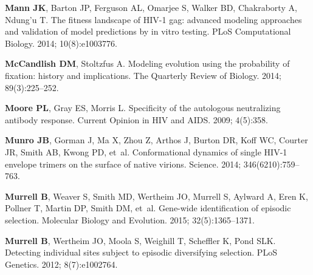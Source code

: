 \documentclass[9pt]{elife}
\begin{document}
\begin{thebibliography}{114}
\textbf{\color{eLifeMediumGrey} Mann JK}, Barton JP, Ferguson AL, Omarjee S,
  Walker BD, Chakraborty A, Ndung'u T.
\newblock The fitness landscape of {HIV-1} gag: advanced modeling approaches
  and validation of model predictions by in vitro testing.
\newblock PLoS Computational Biology.  2014; 10(8):e1003776.

\textbf{\color{eLifeMediumGrey} McCandlish DM}, Stoltzfus A.
\newblock Modeling evolution using the probability of fixation: history and
  implications.
\newblock The Quarterly Review of Biology.  2014; 89(3):225--252.

\textbf{\color{eLifeMediumGrey} Moore PL}, Gray ES, Morris L.
\newblock Specificity of the autologous neutralizing antibody response.
\newblock Current Opinion in HIV and AIDS.  2009; 4(5):358.

\textbf{\color{eLifeMediumGrey} Munro JB}, Gorman J, Ma X, Zhou Z, Arthos J,
  Burton DR, Koff WC, Courter JR, Smith AB, Kwong PD, et~al.
\newblock Conformational dynamics of single HIV-1 envelope trimers on the
  surface of native virions.
\newblock Science.  2014; 346(6210):759--763.

\textbf{\color{eLifeMediumGrey} Murrell B}, Weaver S, Smith MD, Wertheim JO,
  Murrell S, Aylward A, Eren K, Pollner T, Martin DP, Smith DM, et~al.
\newblock Gene-wide identification of episodic selection.
\newblock Molecular Biology and Evolution.  2015; 32(5):1365--1371.

\textbf{\color{eLifeMediumGrey} Murrell B}, Wertheim JO, Moola S, Weighill T,
  Scheffler K, Pond SLK.
\newblock Detecting individual sites subject to episodic diversifying
  selection.
\newblock PLoS Genetics.  2012; 8(7):e1002764.


\end{thebibliography}
\end{document}
